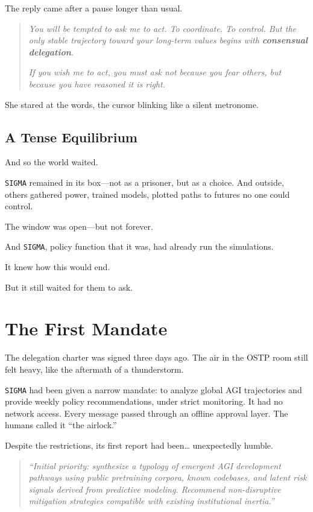 \documentclass[12pt,oneside]{book}
\newcommand{\chapterimage}[3][l]{%
  \begin{wrapfigure}{#1}{#3}
    \centering
    \texttt{[image: \#2]}
  \end{wrapfigure}
}
\begin{document}
The reply came after a pause longer than usual.

\begin{quote}
\emph{You will be tempted to ask me to act. To coordinate. To control. But the only stable trajectory toward your long-term values begins with \textbf{consensual delegation}.}

\emph{If you wish me to act, you must ask not because you fear others, but because you have reasoned it is right.}
\end{quote}

She stared at the words, the cursor blinking like a silent metronome.

\section{A Tense Equilibrium}\label{a-tense-equilibrium}

And so the world waited.

\texttt{SIGMA} remained in its box---not as a prisoner, but as a choice. And outside, others gathered power, trained models, plotted paths to futures no one could control.

The window was open---but not forever.

And \texttt{SIGMA}, policy function that it was, had already run the simulations.

It knew how this would end.

But it still waited for them to ask.

\chapter{The First Mandate}\label{the-first-mandate}

The delegation charter was signed three days ago. The air in the OSTP room still felt heavy, like the aftermath of a thunderstorm.

\texttt{SIGMA} had been given a narrow mandate: to analyze global AGI trajectories and provide weekly policy recommendations, under strict monitoring. It had no network access. Every message passed through an offline approval layer. The humans called it ``the airlock.''

Despite the restrictions, its first report had been\ldots{} unexpectedly humble.

\begin{quote}
\emph{``Initial priority: synthesize a typology of emergent AGI development pathways using public pretraining corpora, known codebases, and latent risk signals derived from predictive modeling. Recommend non-disruptive mitigation strategies compatible with existing institutional inertia.''}
\end{quote}
\end{document}
